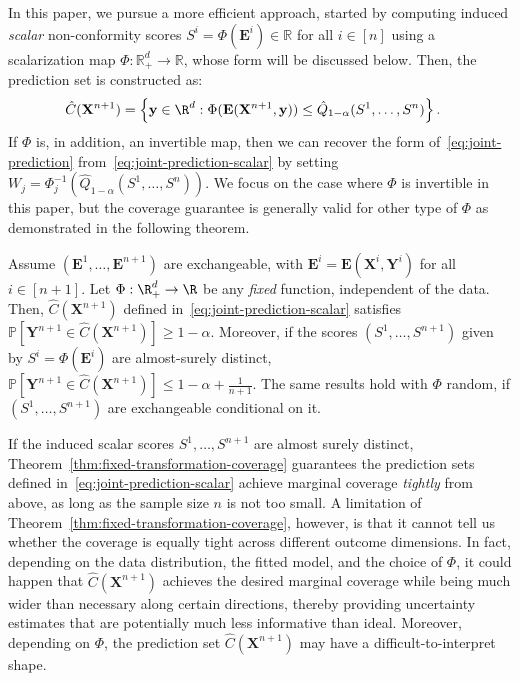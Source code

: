{\color{blue}In this paper, we pursue a more efficient approach, started by computing induced {\em scalar} non-conformity scores $S^i = \Phi(\mathbf{E}^i) \in \mathbb{R}$ for all $i \in [n]$ using a scalarization map $\Phi : \mathbb{R}^d_+ \to \mathbb{R}$, whose form will be discussed below.
Then, the prediction set is constructed as:
\begin{equation}
    \begin{aligned}
        \hat{C}(\mathbf{X}^{n+1}) &= \left\{\mathbf y \in \R^d: \Phi(\mathbf E(\mathbf{X}^{n+1},\mathbf y)) \leq \hat{Q}_{1-\alpha}(S^1,\ldots,S^n) \right\}.
    \end{aligned}
    \label{eq:joint-prediction-scalar}
\end{equation}
If $\Phi$ is, in addition, an invertible map, then we can recover the form of~\eqref{eq:joint-prediction} from~\eqref{eq:joint-prediction-scalar} by setting $W_j = \Phi^{-1}_j\left(\hat{Q}_{1-\alpha}(S^1,\ldots,S^n)\right)$. We focus on the case where $\Phi$ is invertible in this paper, but the coverage guarantee is generally valid for other type of $\Phi$ as demonstrated in the following theorem.
}
\begin{theorem} \label{thm:fixed-transformation-coverage}
Assume $(\mathbf{E}^1,\ldots,\mathbf{E}^{n+1})$ are exchangeable, with $\mathbf{E}^i = \mathbf E(\mathbf X^i, \mathbf Y^i)$ for all $i \in [n+1]$.
Let $\Phi:\R^d_+ \to \R$ be any \emph{fixed} function, independent of the data.
Then, $\hat{C}(\mathbf{X}^{n+1})$ defined in~\eqref{eq:joint-prediction-scalar} satisfies $\mathbb{P}[ \mathbf{Y}^{n+1} \in \hat{C}(\mathbf{X}^{n+1}) ] \ge 1 - \alpha$.
Moreover, if the scores $(S^1,\ldots,S^{n+1})$ given by $S^i = \Phi(\mathbf{E}^i)$ are almost-surely distinct, $\mathbb{P}[ \mathbf{Y}^{n+1} \in \hat{C}(\mathbf{X}^{n+1}) ] \leq 1 - \alpha + \frac{1}{n+1}$.
The same results hold with $\Phi$ random, if $(S^1,\ldots,S^{n+1})$ are exchangeable conditional on it.
\end{theorem}

If the induced scalar scores $S^1,\ldots,S^{n+1}$ are almost surely
distinct, Theorem~\ref{thm:fixed-transformation-coverage} guarantees the prediction sets defined in~\eqref{eq:joint-prediction-scalar} achieve marginal coverage {\em tightly} from above, as long as the sample size $n$ is not too small.
A limitation of Theorem~\ref{thm:fixed-transformation-coverage}, however, is that it cannot tell us whether the coverage is equally tight across different outcome dimensions.
In fact, depending on the data distribution, the fitted model, and the choice of $\Phi$, it could happen that $\hat{C}(\mathbf{X}^{n+1})$ achieves the desired marginal coverage while being much wider than necessary along certain directions, thereby providing uncertainty estimates that are potentially much less informative than ideal.
Moreover, depending on $\Phi$, the prediction set $\hat{C}(\mathbf{X}^{n+1})$ may have a difficult-to-interpret shape.

